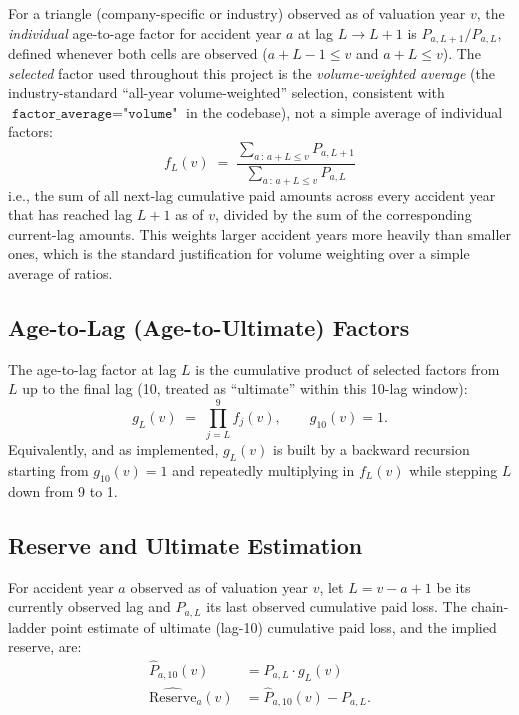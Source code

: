 \documentclass[11pt]{article}
\begin{document}
For a triangle (company-specific or industry) observed as of valuation year $v$, the
\emph{individual} age-to-age factor for accident year $a$ at lag $L \to L+1$ is
$P_{a,L+1} / P_{a,L}$, defined whenever both cells are observed ($a + L - 1 \le v$ and
$a + L \le v$). The \emph{selected} factor used throughout this project is the
\emph{volume-weighted average} (the industry-standard ``all-year volume-weighted'' selection,
consistent with $\texttt{factor\_average} = \texttt{"volume"}$ in the codebase), not a simple
average of individual factors:
\begin{equation}
f_{L}(v) \;=\; \frac{\displaystyle\sum_{a \,:\, a+L \le v} P_{a,L+1}}{\displaystyle\sum_{a \,:\, a+L \le v} P_{a,L}}
\label{eq:selected-factor}
\end{equation}
i.e., the sum of all next-lag cumulative paid amounts across every accident year that has reached
lag $L+1$ as of $v$, divided by the sum of the corresponding current-lag amounts. This weights
larger accident years more heavily than smaller ones, which is the standard justification for
volume weighting over a simple average of ratios.

\subsection{Age-to-Lag (Age-to-Ultimate) Factors}

The age-to-lag factor at lag $L$ is the cumulative product of selected factors from $L$ up to the
final lag (10, treated as ``ultimate'' within this 10-lag window):
\begin{equation}
g_{L}(v) \;=\; \prod_{j=L}^{9} f_{j}(v), \qquad g_{10}(v) = 1.
\label{eq:age-to-lag}
\end{equation}
Equivalently, and as implemented, $g_L(v)$ is built by a backward recursion starting from
$g_{10}(v)=1$ and repeatedly multiplying in $f_{L}(v)$ while stepping $L$ down from 9 to 1.

\subsection{Reserve and Ultimate Estimation}

For accident year $a$ observed as of valuation year $v$, let $L = v-a+1$ be its currently observed
lag and $P_{a,L}$ its last observed cumulative paid loss. The chain-ladder point estimate of
ultimate (lag-10) cumulative paid loss, and the implied reserve, are:
\begin{align}
\widehat{P}_{a,10}(v) &= P_{a,L} \cdot g_{L}(v) \label{eq:estimate}\\
\widehat{\text{Reserve}}_a(v) &= \widehat{P}_{a,10}(v) - P_{a,L}. \label{eq:reserve}
\end{align}
\end{document}
